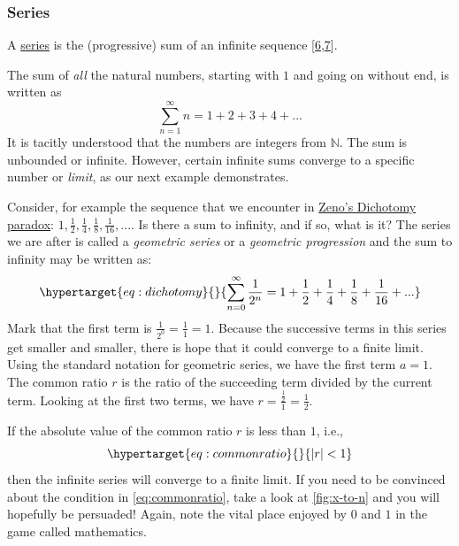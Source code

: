\documentclass[
  a4paper,
]{article}
\begin{document}
\hypertarget{series}{%
\subsubsection{Series}\label{series}}

A \href{https://mathworld.wolfram.com/Series.html}{series} is the
(progressive) sum of an infinite sequence
{[}\protect\hyperlink{ref-wikiseries}{6},\protect\hyperlink{ref-wolframseries}{7}{]}.

The sum of \emph{all} the natural numbers, starting with \(1\) and going
on without end, is written as \[
\sum_{n = 1}^{\infty}n = 1 + 2 + 3 + 4 + ...
\] It is tacitly understood that the numbers are integers from
\(\mathbb{N}\). The sum is unbounded or infinite. However, certain
infinite sums converge to a specific number or \emph{limit}, as our next
example demonstrates.

Consider, for example the sequence that we encounter in
\href{https://en.wikipedia.org/wiki/Zeno\%27s_paradoxes}{Zeno's
Dichotomy paradox}:
\(1, \frac{1}{2}, \frac{1}{4}, \frac{1}{8}, \frac{1}{16}, ...\). Is
there a sum to infinity, and if so, what is it? The series we are after
is called a \emph{geometric series} or a \emph{geometric progression}
and the sum to infinity may be written as:
\begin{equation}\protect\hypertarget{eq:dichotomy}{}{
\sum_{n = 0}^{\infty}\frac{1}{2^{n}} = 1 + \frac{1}{2} + \frac{1}{4} + \frac{1}{8} +
\frac{1}{16} + ...
}\label{eq:dichotomy}\end{equation} Mark that the first term is
\(\frac{1}{2^0} = \frac{1}{1} = 1\). Because the successive terms in
this series get smaller and smaller, there is hope that it could
converge to a finite limit. Using the standard notation for geometric
series, we have the first term \(a = 1\). The common ratio \(r\) is the
ratio of the succeeding term divided by the current term. Looking at the
first two terms, we have \(r = \frac{\frac{1}{2}}{1} = \frac{1}{2}\).

If the absolute value of the common ratio \(r\) is less than \(1\),
i.e.,
\begin{equation}\protect\hypertarget{eq:commonratio}{}{\lvert{r}\rvert < 1
}\label{eq:commonratio}\end{equation} then the infinite series will
converge to a finite limit. If you need to be convinced about the
condition in \cref{eq:commonratio}, take a look at \cref{fig:x-to-n} and
you will hopefully be persuaded! Again, note the vital place enjoyed by
\(0\) and \(1\) in the game called mathematics.
\normalfont
\end{document}
